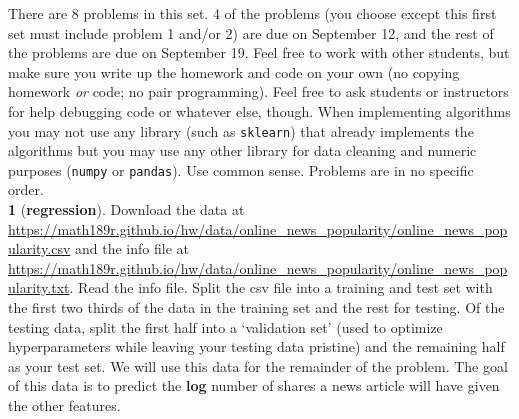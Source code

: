 \documentclass[12pt,letterpaper,fleqn]{hmcpset}
\begin{document}
There are 8 problems in this set. 4 of the problems (you choose except this first
set must include problem 1 and/or 2) are due on September 12,
and the rest of the problems are due on September 19. Feel
free to work with other students, but make sure you write up the homework
and code on your own (no copying homework \textit{or} code; no pair programming).
Feel free to ask students or instructors for help debugging code or whatever else,
though.
When implementing algorithms you may not use any library (such as \texttt{sklearn})
that already implements the algorithms but you may use any other library for
data cleaning and numeric purposes (\texttt{numpy} or \texttt{pandas}). Use common
sense. Problems are in no specific order.\\[1em]


\textbf{1} (\textbf{regression}). Download the data at 
\url{https://math189r.github.io/hw/data/online_news_popularity/online_news_popularity.csv}
and the info file at
\url{https://math189r.github.io/hw/data/online_news_popularity/online_news_popularity.txt}.
Read the info file. Split the csv file into a training and test set with
the first two thirds of the data in the training set and the rest for testing.
Of the testing data, split the first half into a `validation set' (used
to optimize hyperparameters while leaving your testing data pristine) and
the remaining half as your test set.
We will use this data for the remainder of the problem. The goal of this data
is to predict the \textbf{log} number of shares a news article will have given the other
features.
\end{document}
